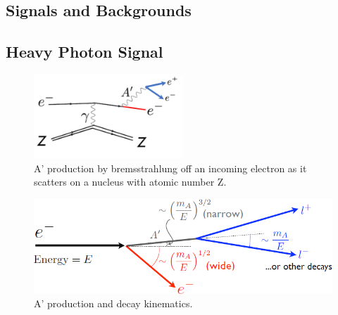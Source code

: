 \documentclass[b1]{sciposter}
\begin{document}
\begin{multicols}{3}


	\section*{Signals and Backgrounds}
	\subsection*{Heavy Photon Signal}
	\begin{figure}
		\begin{center}
			\includegraphics[width=0.5\textwidth]{signal}
		\end{center}
		\caption{A' production by bremsstrahlung off an incoming electron as it scatters on a nucleus with atomic number Z.}
	\end{figure}

	\begin{figure}
		\begin{center}
			\includegraphics[width=\textwidth]{ap_kine}
		\end{center}
		\caption{A' production and decay kinematics.}
	\end{figure}


\end{multicols}
\end{document}
